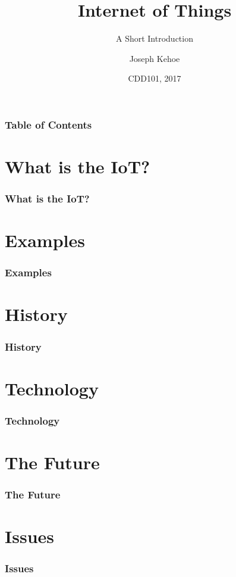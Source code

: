 \documentclass{beamer}
\title[IoT] %
{Internet of Things}
\subtitle{A Short Introduction}
\author[Dr. Joseph Kehoe] %
{Joseph Kehoe\inst{1}}
\institute[IT Carlow] %
{
	\inst{1}%
	Department of Computing and Networking\\
	Institute of Technology Carlow
}
\date[ITC 2017] %
{CDD101, 2017}
\begin{document}
 
\frame{\titlepage}
 
 
 
 \begin{frame}
 	\frametitle{Table of Contents}
 	\tableofcontents
 \end{frame}
 
 
 \section{What is the IoT?}
\begin{frame}
\frametitle{What is the IoT?}


\end{frame}

 \section{Examples}
\begin{frame}
	\frametitle{Examples}

\end{frame}

  \section{History}
  \begin{frame}
  	\frametitle{History}

  \end{frame}
  
   \section{Technology}
   \begin{frame}
   	\frametitle{Technology}

   \end{frame}
   
    \section{The Future}
    \begin{frame}
    	\frametitle{The Future}

    \end{frame}
    
     \section{Issues}
     \begin{frame}
     	\frametitle{Issues}

     \end{frame}
        
\end{document}
